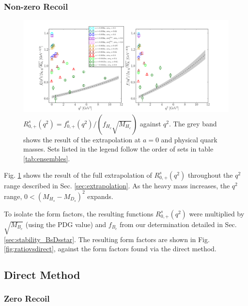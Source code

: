\subsubsection{Non-zero Recoil}

\begin{figure}[htb!]
  \hspace{-85pt}
  \includegraphics[width=1.50\textwidth]{images/BsDs/ratio/f0fpfHc_vsq2.pdf}
  \caption{ $R_{0,+}^s(q^2) = f_{0,+}^s(q^2)/(f_{H_c}\sqrt{M_{H_c}})$ against $q^2$. The grey band shows the result of the extrapolation at $a=0$ and physical quark masses. Sets listed in the legend follow the order of sets in table \ref{tab:ensembles}. \label{fig:ratiodata}}
\end{figure}

Fig. \ref{fig:ratiodata} shows the result of the full extrapolation of $R_{0,+}^s(q^2)$ throughout the $q^2$ range described in Sec. \ref{sec:extrapolation}. As the heavy mass increases, the $q^2$ range, $0 < (M_{H_s}-M_{D_s})^2$ expands.

To isolate the form factors, the resulting functions $R_{0,+}^s(q^2)$ were multiplied by $\sqrt{M_{B_c}}$ (using the PDG value) and $f_{B_c}$ from our determination detailed in Sec. \ref{sec:stability_BsDsstar}. The resulting form factors are shown in Fig. \ref{fig:ratiovsdirect}, against the form factors found via the direct method.

\subsection{Direct Method}

\subsubsection{Zero Recoil}
\label{sec:directq2max}

